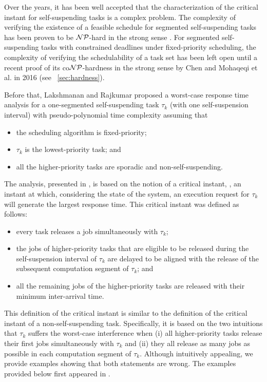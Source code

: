 Over the years, it has been well accepted that the characterization of the critical instant for self-suspending tasks is a complex problem. The complexity of verifying the existence of a feasible schedule for segmented self-suspending tasks has been proven to be ${\cal NP}$-hard in the strong sense \cite{Ridouard_2004}.  For segmented self-suspending tasks with constrained deadlines under fixed-priority scheduling, 
the complexity of verifying the schedulability of a task set has been left open until a recent proof of its co${\cal NP}$-hardness in the strong sense by Chen \cite{RTSS2016-suspension} and Mohaqeqi et al. \cite{DBLP:conf/rtns/MohaqeqiE016} in 2016 (see \mysectionref{}~\ref{sec:hardness}).

Before that, Lakshmanan and Rajkumar \cite{LR:rtas10} proposed a worst-case response time analysis for a one-segmented self-suspending task $\tau_k$ (with one self-suspension interval) with pseudo-polynomial time complexity assuming that 
\begin{itemize}
\item the scheduling algorithm is fixed-priority;
\item $\tau_k$ is the lowest-priority task;  and
\item all the higher-priority tasks are sporadic and non-self-suspending.
\end{itemize}
The analysis, presented in \cite{LR:rtas10}, is based on the notion of
a critical instant, \ie, an instant at which, considering the state of the system, an execution request for $\tau_k$ will generate the largest response time. This critical instant was defined as follows:
\begin{itemize}
	\item every task releases a job simultaneously with $\tau_k$;
	\item the jobs of higher-priority tasks that are eligible to be released during the self-suspension interval of $\tau_k$ are delayed to be aligned with the release of the subsequent computation segment of $\tau_k$; and
	\item all the remaining jobs of the higher-priority tasks are released with their minimum inter-arrival time.
\end{itemize}

This definition of the critical instant is similar to the definition of the critical instant of a non-self-suspending task. Specifically, it is based on the two intuitions that $\tau_k$ suffers the worst-case interference when (i) all higher-priority tasks release their first jobs simultaneously with $\tau_k$ and (ii) they all release as many jobs as possible in each computation segment of $\tau_k$. Although intuitively appealing, we provide examples showing that both statements are wrong. The examples provided below  first appeared in \cite{ecrts15nelissen}.

